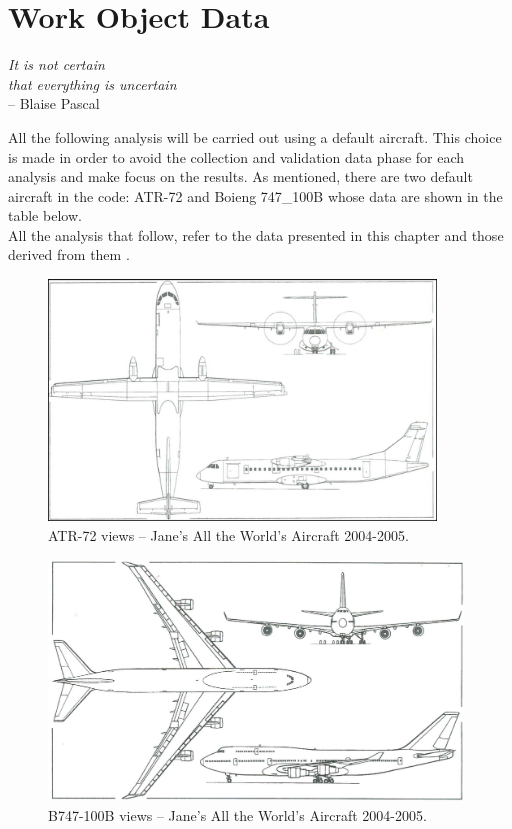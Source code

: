 \chapter{Work Object Data}
\label{ch:workobject}

\begin{flushright}
	{\smaller
		\textit{It is not certain\\ that everything is uncertain}\\
		-- Blaise Pascal}
\end{flushright}

All the following analysis will be carried out using a default aircraft. This choice is made in order to avoid the collection and validation data phase for each analysis and make focus on the results. As mentioned, there are two default aircraft in the code: ATR-72 and Boieng 747\_100B whose data are shown in the table below.\\
All the analysis that follow, refer to the data presented in this chapter and those derived from them .

\begin{figure}[H]
\centering
\includegraphics[height=6.4cm]{Immagini/ATR-72}
\caption{ATR-72 views – Jane’s All the World’s Aircraft 2004-2005.}
\label{atr}
\end{figure}
\begin{figure}[H]
\centering
\includegraphics[height=6.4cm]{Immagini/B747-100B}
\caption{B747-100B views – Jane’s All the World’s Aircraft 2004-2005.}
\label{boeing}
\end{figure}